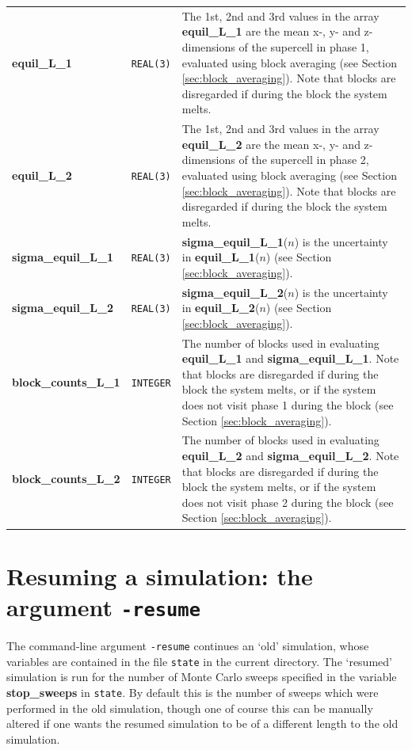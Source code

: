 \documentclass{report}
\begin{document}
\begin{landscape}
\begin{center}
\begin{longtable}{ l l p{8cm}}
\textbf{equil\_L\_1} & \texttt{REAL(3)} & The 1st, 2nd and 3rd values in the array \textbf{equil\_L\_1} are the mean x-, y- and z-dimensions of the
supercell in phase 1, evaluated using block averaging (see Section \ref{sec:block_averaging}). Note that blocks are disregarded if during the block the system melts. \\
\textbf{equil\_L\_2} & \texttt{REAL(3)} &  The 1st, 2nd and 3rd values in the array \textbf{equil\_L\_2} are the mean x-, y- and z-dimensions of the
supercell in phase 2, evaluated using block averaging (see Section \ref{sec:block_averaging}). Note that blocks are disregarded if during the block the system melts. \\
\textbf{sigma\_equil\_L\_1} & \texttt{REAL(3)} & \textbf{sigma\_equil\_L\_1}($n$) is the uncertainty in \textbf{equil\_L\_1}($n$) (see Section \ref{sec:block_averaging}). \\
\textbf{sigma\_equil\_L\_2} & \texttt{REAL(3)} & \textbf{sigma\_equil\_L\_2}($n$) is the uncertainty in \textbf{equil\_L\_2}($n$) (see Section \ref{sec:block_averaging}). \\
\textbf{block\_counts\_L\_1} & \texttt{INTEGER} & The number of blocks used in evaluating \textbf{equil\_L\_1} and \textbf{sigma\_equil\_L\_1}. Note that blocks are
disregarded if during the block the system melts, or if the system does not visit phase 1 during the block  (see Section \ref{sec:block_averaging}). \\
\textbf{block\_counts\_L\_2} & \texttt{INTEGER} &  The number of blocks used in evaluating \textbf{equil\_L\_2} and \textbf{sigma\_equil\_L\_2}. Note that blocks are
disregarded if during the block the system melts, or if the system does not visit phase 2 during the block (see Section \ref{sec:block_averaging}). \\
\end{longtable}
\end{center}
\end{landscape}


\section{Resuming a simulation: the argument \texttt{-resume}}\label{sec:resume}
The command-line argument \texttt{-resume} continues an `old' simulation, whose variables are contained in the file \texttt{state} in the current 
directory. The `resumed' simulation is run for the number of Monte Carlo sweeps specified in the variable \textbf{stop\_sweeps} in \texttt{state}.
By default this is the number of sweeps which were performed in the old simulation, though one of course this can be manually altered if one wants
the resumed simulation to be of a different length to the old simulation.
\end{document}
